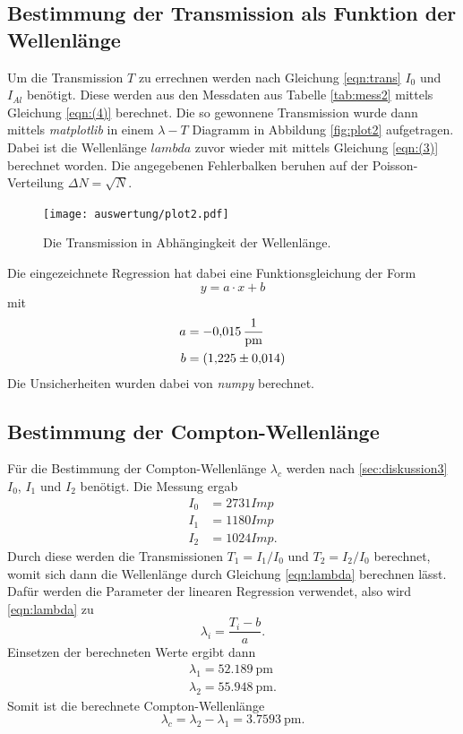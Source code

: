 \subsection{Bestimmung der Transmission als Funktion der Wellenlänge}
\label{sec:transmission}
Um die Transmission $T$ zu errechnen werden nach Gleichung \eqref{eqn:trans} $I_{0}$ und $I_{Al}$ benötigt. Diese werden aus den Messdaten
aus Tabelle \ref{tab:mess2} mittels Gleichung \eqref{eqn:(4)} berechnet. Die so gewonnene Transmission wurde dann mittels 
\textit{matplotlib} \cite{matplotlib} in einem $\lambda-T$ Diagramm in Abbildung \ref{fig:plot2} aufgetragen. Dabei ist die Wellenlänge
$lambda$ zuvor wieder mit mittels Gleichung \eqref{eqn:(3)} berechnet worden. Die angegebenen Fehlerbalken beruhen auf der Poisson-Verteilung
$\Delta N=\sqrt{N}$.
\begin{figure}[H]
    \centering
    \texttt{[image: auswertung/plot2.pdf]}
    \caption{Die Transmission in Abhängingkeit der Wellenlänge.}
    \label{fig:plot1}
\end{figure}
\noindent
Die eingezeichnete Regression hat dabei eine Funktionsgleichung der Form
  \begin{equation*}
      y=a\cdot x+b \label{eqn:gerade}
  \end{equation*} 
mit
  \begin{align*}
    a &= \SI{-0.015 \pm 0.000}{\per\pico\metre}\\
    b &= \SI{1.225 \pm 0.014}.
  \end{align*}
Die Unsicherheiten wurden dabei von  \textit{numpy} \cite{numpy} berechnet.

\subsection{Bestimmung der Compton-Wellenlänge}
\label{sec:compton}
Für die Bestimmung der Compton-Wellenlänge $\lambda_c$ werden nach \ref{sec:diskussion3} $I_0$, $I_1$ und $I_2$ benötigt.
Die Messung ergab
\begin{align*}
    I_0 &= 2731 \si{Imp}\\
    I_1 &= 1180 \si{Imp}\\
    I_2 &= 1024 \si{Imp}.
\end{align*}  
Durch diese werden die Transmissionen $T_1=I_1/I_0$ und  $T_2=I_2/I_0$ berechnet, womit sich dann die Wellenlänge durch Gleichung
\eqref{eqn:lambda} berechnen lässt. Dafür werden die Parameter der linearen Regression verwendet, also wird \eqref{eqn:lambda} zu
\begin{equation*}
    \lambda_i = \frac{T_i -b}{a}. 
\end{equation*}
Einsetzen der berechneten Werte ergibt dann
\begin{align*}
    \lambda_1 = \SI{52.189}{\pico\metre}\\
    \lambda_2 = \SI{55.948}{\pico\metre}.
\end{align*}
Somit ist die berechnete Compton-Wellenlänge
\begin{equation*}
    \lambda_c=\lambda_2-\lambda_1= \SI{3.7593}{\pico\metre}.
\end{equation*}
